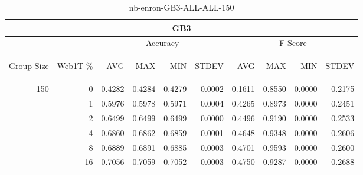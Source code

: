\begin{center}
\begin{table}[htbp]
\begin{tabular}{ | r | r | r | r | r | r | r | r | r | r |}
\hline
\multicolumn{10}{|c|}{GB3}\\
\hline
 & & \multicolumn{4}{|c|}{Accuracy} & \multicolumn{4}{|c|}{F-Score}\\ \cline{3-10}
\begin{sideways}Group Size\end{sideways} & \begin{sideways}Web1T \%\end{sideways} & \begin{sideways}AVG\end{sideways} & \begin{sideways}MAX\end{sideways} & \begin{sideways}MIN\end{sideways} & \begin{sideways}STDEV\end{sideways} & \begin{sideways}AVG\end{sideways} & \begin{sideways}MAX\end{sideways} & \begin{sideways}MIN\end{sideways} & \begin{sideways}STDEV\end{sideways}\\
\hline
\multirow{6}{*}{150}
 & 0 & 0.4282 & 0.4284 & 0.4279 & 0.0002 & 0.1611 & 0.8550 & 0.0000 & 0.2175\\ \cline{2-10}
 & 1 & 0.5976 & 0.5978 & 0.5971 & 0.0004 & 0.4265 & 0.8973 & 0.0000 & 0.2451\\ \cline{2-10}
 & 2 & 0.6499 & 0.6499 & 0.6499 & 0.0000 & 0.4496 & 0.9190 & 0.0000 & 0.2533\\ \cline{2-10}
 & 4 & 0.6860 & 0.6862 & 0.6859 & 0.0001 & 0.4648 & 0.9348 & 0.0000 & 0.2606\\ \cline{2-10}
 & 8 & 0.6889 & 0.6891 & 0.6885 & 0.0003 & 0.4701 & 0.9593 & 0.0000 & 0.2600\\ \cline{2-10}
 & 16 & 0.7056 & 0.7059 & 0.7052 & 0.0003 & 0.4750 & 0.9287 & 0.0000 & 0.2688\\ \cline{2-10}
\hline
\end{tabular}
\caption{nb-enron-GB3-ALL-ALL-150}
\end{table}
\end{center}

